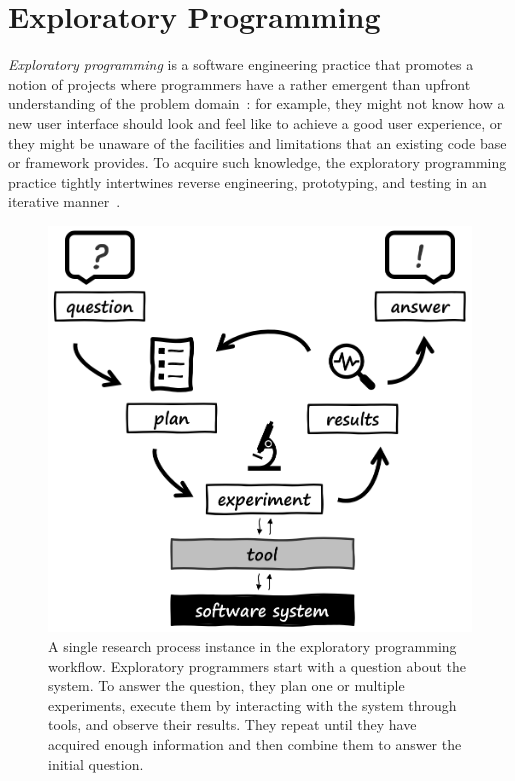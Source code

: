 
\section{Exploratory Programming}
\label{sec:background/exp}

\emph{Exploratory programming} is a software engineering practice that promotes a notion of projects where programmers have a rather emergent than upfront understanding of the problem domain~\cite{sandberg1988smalltalk,kery2017exploring,rein2018exploratory}:
for example, they might not know how a new user interface should look and feel like to achieve a good user experience, or they might be unaware of the facilities and limitations that an existing code base or framework provides.
To acquire such knowledge, the exploratory programming practice tightly intertwines reverse engineering, prototyping, and testing in an iterative manner~\cite{taeumel2022pattern}.

\begin{figure}
	\centering
	\includegraphics[width=.7\textwidth]{01_exp/simple_process.png}
	\caption[A single \emph{research process} in the \emph{exploratory programming workflow}.]{
		A single research process instance in the exploratory programming workflow.
		Exploratory programmers start with a question about the system.
		To answer the question, they plan one or multiple experiments, execute them by interacting with the system through tools, and observe their results.
		They repeat until they have acquired enough information and then combine them to answer the initial question.
	}
	\label{fig:background/exp/simple_process}
\end{figure}

